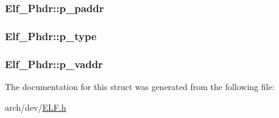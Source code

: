\hypertarget{struct_elf___phdr_addf69d829ef4841558be02cd37f2d0c9}{
\subsubsection[{p\+\_\+paddr}]{ Elf\+\_\+\+Phdr\+::p\+\_\+paddr}}\label{struct_elf___phdr_addf69d829ef4841558be02cd37f2d0c9}
\hypertarget{struct_elf___phdr_af3c63d32247aa09a84c497809dc27d8b}{
\subsubsection[{p\+\_\+type}]{ Elf\+\_\+\+Phdr\+::p\+\_\+type}}\label{struct_elf___phdr_af3c63d32247aa09a84c497809dc27d8b}
\hypertarget{struct_elf___phdr_a3c26aa6089ef8332572f6567f368bea6}{
\subsubsection[{p\+\_\+vaddr}]{ Elf\+\_\+\+Phdr\+::p\+\_\+vaddr}}\label{struct_elf___phdr_a3c26aa6089ef8332572f6567f368bea6}


The documentation for this struct was generated from the following file\+:\begin{DoxyCompactItemize}
\item 
arch/dev/\hyperlink{_e_l_f_8h}{E\+L\+F.\+h}\end{DoxyCompactItemize}
